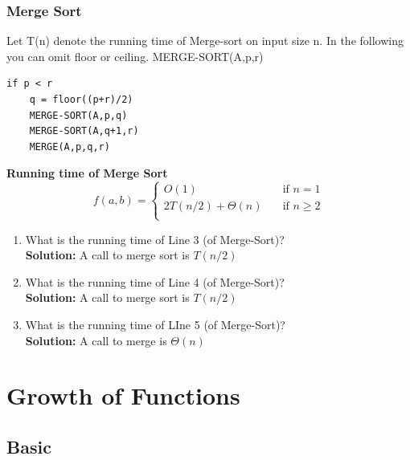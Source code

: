 \documentclass[11pt,fleqn]{book}
\begin{document}
\subsection{Merge Sort} 
\begin{example}
Let T(n) denote the running time of Merge-sort on input size n. In the following you can omit floor or ceiling. 
MERGE-SORT(A,p,r)
\begin{lstlisting}
if p < r 
    q = floor((p+r)/2)
    MERGE-SORT(A,p,q)
    MERGE-SORT(A,q+1,r)
    MERGE(A,p,q,r)
\end{lstlisting}
\end{example}
\begin{remark} 
\textbf{Running time of Merge Sort} 
\[
f(a,b) = 
     \begin{cases}
       O(1) &\quad\text{if } n = 1\\
       2T(n/2) + \Theta(n) &\quad\text{if }  n \geq 2 \\
     \end{cases}
\]
\end{remark}
\begin{enumerate}
    \item What is the running time of Line 3 (of Merge-Sort)? \\
    \textbf{Solution:} A call to merge sort is $T(n/2)$
    \item What is the running time of Line 4 (of Merge-Sort)?\\
     \textbf{Solution:} A call to merge sort is $T(n/2)$
    \item What is the running time of LIne 5 (of Merge-Sort)?\\
     \textbf{Solution:} A call to merge is $\Theta(n)$
\end{enumerate}

\chapter{ Growth of Functions}

\section{Basic}
\end{document}
